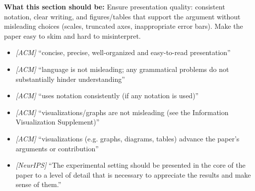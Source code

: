 \noindent\textbf{What this section should be:}
Ensure presentation quality: consistent notation, clear writing, and figures/tables that support the argument without misleading choices (scales, truncated axes, inappropriate error bars). Make the paper easy to skim and hard to misinterpret.
\begin{itemize}
  \item \textit{[ACM]} ``concise, precise, well-organized and easy-to-read presentation''
  \item \textit{[ACM]} ``language is not misleading; any grammatical problems do not substantially hinder understanding''
  \item \textit{[ACM]} ``uses notation consistently (if any notation is used)''
  \item \textit{[ACM]} ``visualizations/graphs are not misleading (see the Information Visualization Supplement)''
  \item \textit{[ACM]} ``visualizations (e.g. graphs, diagrams, tables) advance the paper’s arguments or contribution''
  \item \textit{[NeurIPS]} ``The experimental setting should be presented in the core of the paper to a level of detail that is necessary to appreciate the results and make sense of them.''
\end{itemize}